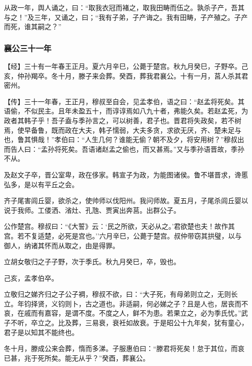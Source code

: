 \documentclass[]{article}
\begin{document}
从政一年，舆人诵之，曰：``取我衣冠而褚之，取我田畴而伍之。孰杀子产，吾其与之！''及三年，又诵之，曰；``我有子弟，子产诲之。我有田畴，子产殖之。子产而死，谁其嗣之？''

\hypertarget{header-n2330}{%
\subsubsection{襄公三十一年}\label{header-n2330}}

【经】三十有一年春王正月。夏六月辛巳，公薨于楚宫。秋九月癸巳，子野卒。己亥，仲孙羯卒。冬十月，滕子来会葬。癸酉，葬我君襄公。十有一月，莒人杀其君密州。

【传】三十一年春，王正月，穆叔至自会，见孟孝伯，语之曰：``赵孟将死矣。其语偷，不似民主。且年未盈五十，而谆谆焉如八九十者，弗能久矣。若赵孟死，为政者其韩子乎！吾子盍与季孙言之，可以树善，君子也。晋君将失政矣，若不树焉，使早备鲁，既而政在大夫，韩子懦弱，大夫多贪，求欲无厌，齐、楚未足与也，鲁其惧哉！''孝伯曰：``人生几何？谁能无偷？朝不及夕，将安用树？''穆叔出而告人曰：``孟孙将死矣。吾语诸赵孟之偷也，而又甚焉。''又与季孙语晋故，季孙不从。

及赵文子卒，晋公室卑，政在侈家。韩宣子为政，为能图诸侯。鲁不堪晋求，谗慝弘多，是以有平丘之会。

齐子尾害闾丘婴，欲杀之，使帅师以伐阳州。我问师故。夏五月，子尾杀闾丘婴以说于我师。工偻洒、渻灶、孔虺、贾寅出奔莒。出群公子。

公作楚宫。穆叔曰：``《大誓》云：`民之所欲，天必从之。'君欲楚也夫！故作其宫。若不复适楚，必死是宫也。''六月辛巳，公薨于楚宫。叔仲带窃其拱璧，以与御人，纳诸其怀而从取之，由是得罪。

立胡女敬归之子子野，次于季氏。秋九月癸巳，卒，毁也。

己亥，孟孝伯卒。

立敬归之娣齐归之子公子裯，穆叔不欲，曰：``大子死，有母弟则立之，无则长立。年钧择贤，义钧则卜，古之道也。非适嗣，何必娣之子？且是人也，居丧而不哀，在戚而有嘉容，是谓不度。不度之人，鲜不为患。若果立之，必为季氏忧。''武子不听，卒立之。比及葬，三易衰，衰衽如故衰。于是昭公十九年矣，犹有童心，君子是以知其不能终也。

冬十月，滕成公来会葬，惰而多涕。子服惠伯曰：``滕君将死矣！怠于其位，而哀已甚，兆于死所矣。能无从乎？''癸酉，葬襄公。
\end{document}
